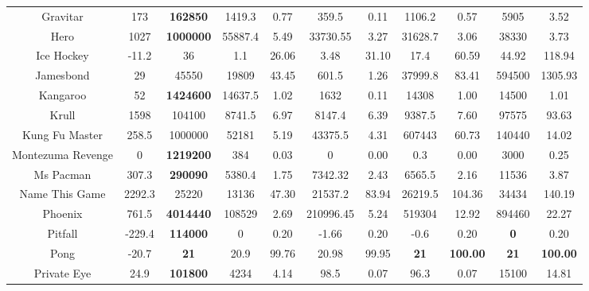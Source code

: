 \documentclass[nohyperref]{article}
\newcommand{\best}[1]{\textbf{#1}}
\theoremstyle{plain}
\begin{document}
\begin{table}[!hb]
\begin{center}
\begin{tabular}{|c| c| c| c c| c c| c c| c c| }
 Gravitar           & 173       & \textbf{162850}    & 1419.3   &0.77    & 359.5      & 0.11       & 1106.2  & 0.57      &5905              &3.52           \\
 Hero               & 1027      & \textbf{1000000}   & 55887.4  &5.49    & 33730.55   & 3.27       & 31628.7 & 3.06      &38330                      &3.73           \\
 Ice Hockey         & -11.2     & 36        & 1.1      &26.06   & 3.48       & 31.10      & 17.4    & 60.59     &44.92              &118.94       \\
 Jamesbond          & 29        & 45550     & 19809    &43.45   & 601.5      & 1.26       & 37999.8 & 83.41     &594500              &1305.93 \\
 Kangaroo           & 52        & \textbf{1424600}   & 14637.5  &1.02    & 1632       & 0.11       & 14308   & 1.00      &14500                      &1.01            \\
 Krull              & 1598      & 104100    & 8741.5   &6.97    & 8147.4     & 6.39       & 9387.5  & 7.60      &97575             &93.63          \\
 Kung Fu Master     & 258.5     & 1000000   & 52181    &5.19    & 43375.5    & 4.31       & 607443  & 60.73     &140440            &14.02          \\
 Montezuma Revenge  &0          & \textbf{1219200}   & 384      &0.03    & 0          & 0.00       & 0.3     & 0.00      &3000              &0.25           \\
 Ms Pacman          & 307.3     & \textbf{290090}    & 5380.4   &1.75    & 7342.32    & 2.43       & 6565.5  & 2.16      &11536             &3.87           \\
 Name This Game     & 2292.3    & 25220     & 13136    &47.30   & 21537.2    & 83.94      & 26219.5 & 104.36    &34434               &140.19     \\
 Phoenix            & 761.5     & \textbf{4014440}   & 108529   &2.69    & 210996.45  & 5.24       & 519304  & 12.92     &894460            &22.27         \\
 Pitfall            & -229.4    & \textbf{114000}    & 0        &0.20    & -1.66      & 0.20       & -0.6    & 0.20      &\best{0    }      &0.20           \\
 Pong               & -20.7     & \textbf{21}        & 20.9     &99.76   & 20.98      & 99.95      & \textbf{21}      & \textbf{100.00}    &\best{21   }      &\best{100.00 }    \\
 Private Eye        & 24.9      & \textbf{101800}    & 4234     &4.14    & 98.5       & 0.07       & 96.3    & 0.07      &15100             &14.81          \\

\end{tabular}
\end{center}
\end{table}
\end{document}
